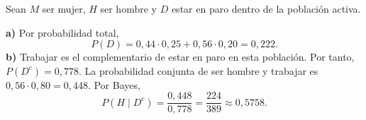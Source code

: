 Sean $M$ ser mujer, $H$ ser hombre y $D$ estar en paro dentro de la población activa.

\textbf{a)} Por probabilidad total,
\[
 P(D)=0{,}44\cdot0{,}25+0{,}56\cdot0{,}20=\boxed{0{,}222}.
\]
\textbf{b)} Trabajar es el complementario de estar en paro en esta población. Por tanto, $P(D^c)=0{,}778$. La probabilidad conjunta de ser hombre y trabajar es $0{,}56\cdot0{,}80=0{,}448$. Por Bayes,
\[
 P(H\mid D^c)=\frac{0{,}448}{0{,}778}
 =\boxed{\frac{224}{389}}\approx0{,}5758.
\]
